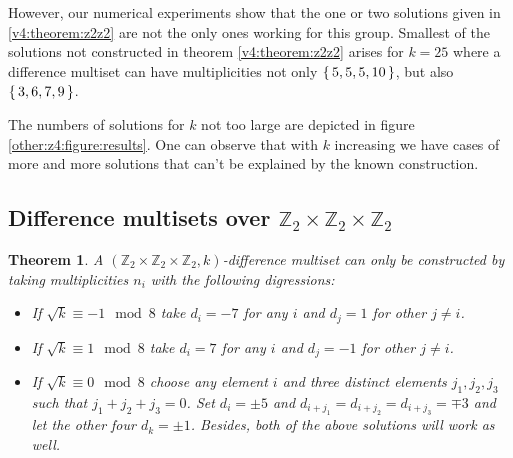 \documentclass{article}
\theoremstyle{plain}
\newtheorem{theorem}{Theorem}[section]
\theoremstyle{definition}
\theoremstyle{remark}
\begin{document}
			However, our numerical experiments show that the one or two solutions given in \ref{v4:theorem:z2z2} are not the only ones working for this group. Smallest of the solutions not constructed in theorem \ref{v4:theorem:z2z2} arises for $k=25$ where a difference multiset can have multiplicities not only $\set{5,5,5,10}$, but also $\set{3,6,7,9}$. 

			The numbers of solutions for $k$ not too large are depicted in figure \ref{other:z4:figure:results}. One can observe that with $k$ increasing we have cases of more and more solutions that can't be explained by the known construction.
			
		\subsection{Difference multisets over $\mathbb Z_2 \times \mathbb Z_2 \times \mathbb Z_2$}
			\begin{theorem}
				A $(\mathbb Z_2 \times \mathbb Z_2 \times \mathbb Z_2, k)$-difference multiset can only be constructed by taking multiplicities $n_i$ with the following digressions:
				\begin{itemize}
					\item If $\sqrt k \equiv -1 \mod 8$ take $d_i=-7$ for any $i$ and $d_j=1$ for other $j\neq i$.
					\item If $\sqrt k \equiv 1 \mod 8$ take $d_i=7$ for any $i$ and $d_j=-1$ for other $j\neq i$.
					\item If $\sqrt k \equiv 0 \mod 8$ choose any element $i$ and three distinct elements $j_1,j_2,j_3$ such that $j_1+j_2+j_3=0$. Set $d_i=\pm 5$ and $d_{i+j_1}=d_{i+j_2}=d_{i+j_3}=\mp 3$ and let the other four $d_k = \pm 1$. Besides, both of the above solutions will work as well.
				\end{itemize}
			\end{theorem}
			
\end{document}

